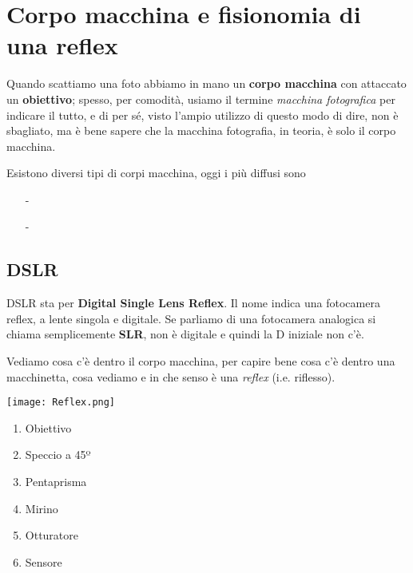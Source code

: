 \section{Corpo macchina e fisionomia di una reflex} \label{sec:fisionomia}

Quando scattiamo una foto abbiamo in mano un \textbf{corpo macchina} con attaccato un \textbf{obiettivo}; spesso, per comodità, usiamo il termine \textit{macchina fotografica} per indicare il tutto, e di per sé, visto l'ampio utilizzo di questo modo di dire, non è sbagliato, ma è bene sapere che la macchina fotografia, in teoria, è solo il corpo macchina.

Esistono diversi tipi di corpi macchina, oggi i più diffusi sono
\begin{itemize}
    \item[-] 
    \item[-] 
\end{itemize}


\subsection{DSLR} \label{subsec:dslr}
DSLR sta per \textbf{Digital Single Lens Reflex}.\newline
Il nome indica una fotocamera reflex, a lente singola e digitale. Se parliamo di una fotocamera analogica si chiama semplicemente \textbf{SLR}, non è digitale e quindi la D iniziale non c'è.

Vediamo cosa c'è dentro il corpo macchina, per capire bene cosa c'è dentro una macchinetta, cosa vediamo e in che senso è una \textit{reflex} (i.e. riflesso).

\setlength{\columnsep}{2.8cm}
\begin{multicols}{2}
    \texttt{[image: Reflex.png]}

    \columnbreak

    \begin{enumerate}
        \setcounter{enumi}{0}
        \item Obiettivo
        \item Speccio a 45º
        \item Pentaprisma
        \item Mirino
        \item Otturatore
        \item Sensore
    \end{enumerate}
\end{multicols}

